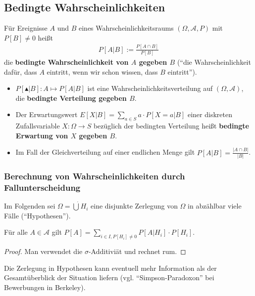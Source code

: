 \subsection{Bedingte Wahrscheinlichkeiten}

\begin{definition} F\"ur Ereignisse $A$ und $B$ eines Wahrscheinlichkeitsraums
$(\Omega, \mathcal{A}, P)$ mit $P[B] \neq 0$ hei\ss t
\begin{eqnarray}
P[A|B]:=\frac{P[A \cap B]}{P[B]} \nonumber
\end{eqnarray}
die \textbf{bedingte Wahrscheinlichkeit von $A$ gegeben $B$} ("`die
Wahrscheinlichkeit daf\"ur, dass $A$ eintritt, wenn wir schon wissen, dass $B$
eintritt"').
\end{definition}

\begin{bemerkung} \quad
\begin{itemize}
\item $P[\blacktriangle|B]: A \mapsto P[A|B]$ ist eine
Wahrscheinlichkeitsverteilung auf $(\Omega, \mathcal{A})$, die \textbf{bedingte
Verteilung gegeben $B$}.
\item Der Erwartungswert $E[X|B] = \sum_{a \in S} a \cdot P[X=a|B]$ einer
diskreten Zufallsvariable $X:\Omega \rightarrow S$ bez\"uglich der bedingten
Verteilung hei\ss t \textbf{bedingte Erwartung von $X$ gegeben $B$}.
\item Im Fall der Gleichverteilung auf einer endlichen Menge gilt $P[A|B] = 
\frac{|A\cap B|}{|B|}$.
\end{itemize}
\end{bemerkung}

\subsubsection{Berechnung von Wahrscheinlichkeiten durch Fallunterscheidung}
Im Folgenden sei $\Omega = \dot{\bigcup} H_i$ eine disjunkte Zerlegung von $\Omega$
in abz\"ahlbar viele F\"alle ("`Hypothesen"').

\begin{satz} F\"ur alle $A \in \mathcal{A}$ gilt $P[A] = \sum_{i \in I, P[H_i]
\neq 0} P[A|H_i] \cdot P[H_i]$.
\end{satz}
\begin{proof} Man verwendet die $\sigma$-Additivi\"at und rechnet rum.
\end{proof}

Die Zerlegung in Hypothesen kann eventuell mehr Information als der
Gesamt\"uberblick der Situation liefern (vgl. "`Simpson-Paradoxon"' bei
Bewerbungen in Berkeley).

